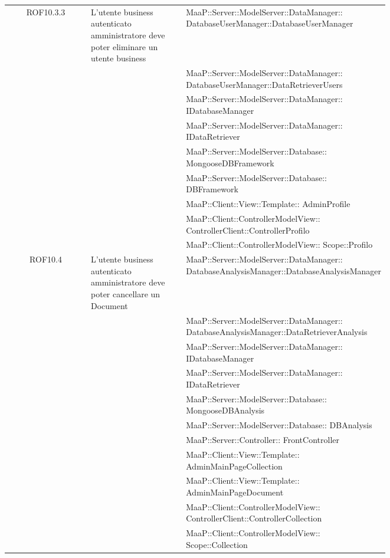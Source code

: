 \begin{center}
\begin{longtable}{|c|p{0.25\linewidth}|p{0.5\linewidth}|}
\midrule
ROF10.3.3
& L'utente business autenticato amministratore deve poter eliminare un utente business
& MaaP::Server::ModelServer::DataManager:: DatabaseUserManager::DatabaseUserManager\\
& & MaaP::Server::ModelServer::DataManager:: DatabaseUserManager::DataRetrieverUsers\\
& & MaaP::Server::ModelServer::DataManager:: IDatabaseManager\\
& & MaaP::Server::ModelServer::DataManager:: IDataRetriever\\
& & MaaP::Server::ModelServer::Database:: MongooseDBFramework\\
& & MaaP::Server::ModelServer::Database:: DBFramework\\
& & MaaP::Client::View::Template:: AdminProfile\\
& & MaaP::Client::ControllerModelView:: ControllerClient::ControllerProfilo\\
& & MaaP::Client::ControllerModelView:: Scope::Profilo\\

\midrule
ROF10.4
& L'utente business autenticato amministratore deve poter cancellare un Document
& MaaP::Server::ModelServer::DataManager:: DatabaseAnalysisManager::DatabaseAnalysisManager\\
& & MaaP::Server::ModelServer::DataManager:: DatabaseAnalysisManager::DataRetrieverAnalysis\\
& & MaaP::Server::ModelServer::DataManager:: IDatabaseManager\\
& & MaaP::Server::ModelServer::DataManager:: IDataRetriever\\
& & MaaP::Server::ModelServer::Database:: MongooseDBAnalysis\\
& & MaaP::Server::ModelServer::Database:: DBAnalysis\\
& & MaaP::Server::Controller:: FrontController\\
& & MaaP::Client::View::Template:: AdminMainPageCollection\\
& & MaaP::Client::View::Template:: AdminMainPageDocument\\
& & MaaP::Client::ControllerModelView:: ControllerClient::ControllerCollection\\
& & MaaP::Client::ControllerModelView:: Scope::Collection\\


\end{longtable}
\end{center}
